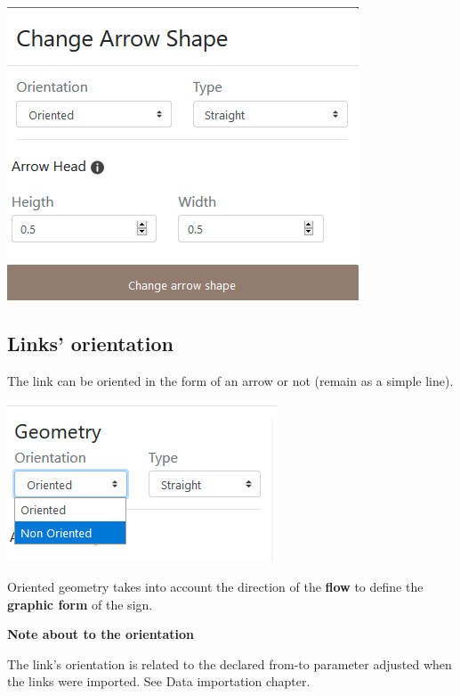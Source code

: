 \documentclass[
  letterpaper,
  DIV=11,
  numbers=noendperiod]{scrreprt}
\begin{document}
\includegraphics{images/Design_links_arrows.png}

\subsection{Links' orientation}\label{links-orientation}

The link can be oriented in the form of an arrow or not (remain as a
simple line).

\includegraphics{images/geom_add_links_geometry1.png}

Oriented geometry takes into account the direction of the \textbf{flow}
to define the \textbf{graphic form} of the sign.

\begin{tcolorbox}[enhanced jigsaw, rightrule=.15mm, bottomrule=.15mm, colback=white, breakable, opacityback=0, colframe=quarto-callout-note-color-frame, toprule=.15mm, leftrule=.75mm, arc=.35mm, left=2mm]
\begin{minipage}[t]{5.5mm}
\textcolor{quarto-callout-note-color}{\faInfo}
\end{minipage}%
\begin{minipage}[t]{\textwidth - 5.5mm}

\vspace{-3mm}\textbf{Note about to the orientation}\vspace{3mm}

The link's orientation is related to the declared from-to parameter
adjusted when the links were imported. See Data importation chapter.

\end{minipage}%
\end{tcolorbox}
\end{document}
